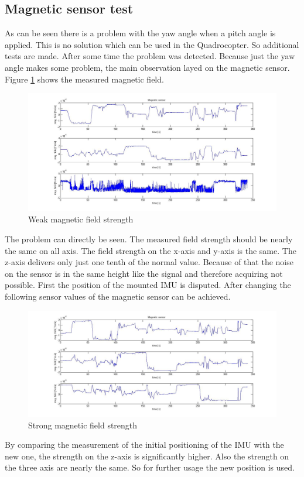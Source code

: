\subsection{Magnetic sensor test}
\label{subsec:MagSensTest}
As can be seen there is a problem with the yaw angle when a pitch angle is applied. This is no solution which can be used in the Quadrocopter. So additional tests are made. After some time the problem was detected. Because just the yaw angle makes some problem, the main observation layed on the magnetic sensor. Figure \ref{fig:field_weak} shows the measured magnetic field.
\begin{figure}[H]
	\centering\includegraphics[width=1.0\textwidth]{fig/Res_Kal_Comp/field_weak}
	\caption{Weak magnetic field strength}
	\label{fig:field_weak}
\end{figure}
The problem can directly be seen. The measured field strength should be nearly the same on all axis. The field strength on the x-axis and y-axis is the same. The z-axis delivers only just one tenth of the normal value. Because of that the noise on the sensor is in the same height like the signal and therefore acquiring not possible. First the position of the mounted IMU is disputed.
After changing the following sensor values of the magnetic sensor can be achieved.
\begin{figure}[H]
	\centering\includegraphics[width=1.0\textwidth]{fig/Res_Kal_Comp/field_strong}
	\caption{Strong magnetic field strength}
	\label{fig:field_strong}
\end{figure}
By comparing the measurement of the initial positioning of the IMU with the new one, the strength on the z-axis is significantly higher. Also the strength on the three axis are nearly the same. So for further usage the new position is used. 

